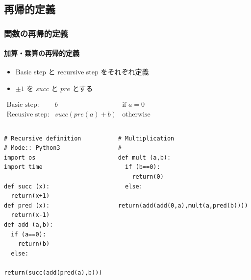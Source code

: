 \subsection{再帰的定義}
\begin{frame}
\frametitle{関数の再帰的定義}
\framesubtitle{加算・乗算の再帰的定義}
   \begin{itemize}
\item Basic step と recursive step をそれぞれ定義
\item \(\pm 1\) を \(\mathit{succ}\) と \(\mathit{pre}\) とする
  \end{itemize}
  \begin{center}
  \begin{math}
    \begin{array}{lll}
\mbox{Basic step:}& b & \mbox{if }a=0 \\
\mbox{Recusive step:}& \mathit{succ}(\mathit{pre}(a)+b) & \mbox{otherwise}
    \end{array}
  \end{math}  
  \end{center}
\vspace{-2zw}
  \begin{columns}
    \begin{column}[t]{0.4\textwidth}
      \begin{lstlisting}[caption={加算},label=add-rec]
# Recursive definition
# Mode:: Python3
import os
import time

def succ (x):
  return(x+1)
def pred (x):
  return(x-1)
def add (a,b):
  if (a==0):
    return(b)
  else:
    return(succ(add(pred(a),b)))
      \end{lstlisting}
    \end{column}
    \begin{column}[t]{0.55\textwidth}
      \begin{lstlisting}[firstnumber=15,caption={乗算},label=mult-rec]
# Multiplication
#
def mult (a,b):
  if (b==0):
    return(0)
  else:
    return(add(add(0,a),mult(a,pred(b))))
      \end{lstlisting}
    \end{column}
  \end{columns}
\end{frame}

